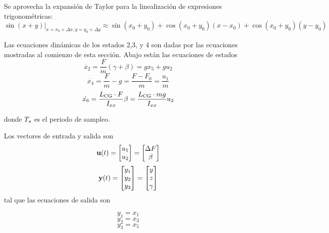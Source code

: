 Se aprovecha la expansión de Taylor para la linealización de expresiones trigonométricas:
\[
\sin(x+y)|_{x=x_0+\Delta x,y=y_0+\Delta y} \approx \sin(x_0+y_0) + \cos(x_0 + y_0) (x-x_0) + \cos(x_0 + y_0) (y-y_0)
\]

Las ecuaciones dinámicas de los estados 2,3, y 4 son dadas por las ecuaciones mostradas al comienzo de esta sección.
Abajo están las ecuaciones de estados
\begin{equation}
	\dot{x_2} = \frac{F}{m} \left( \gamma+\beta \right) = g x_5 + g u_2 
\end{equation}
\begin{equation}
\dot{x_4} = \frac{F}{m} - g =\frac{F-F_0}{m}= \frac{u_1}{m}
\end{equation}
\begin{equation}
\dot{x_6} = \frac{L_{\mathrm{CG}} \cdot F}{I_{xx}} \beta = \frac{L_{\mathrm{CG}} \cdot mg}{I_{xx}} u_2 
\end{equation}

donde $T_s$ es el periodo de sampleo.

Los vectores de entrada y salida son
\[
\mathbf{u}(t) = \begin{bmatrix}
u_1 \\
u_2
\end{bmatrix} = \begin{bmatrix}
\Delta F \\
\beta
\end{bmatrix}
\]
\[
\mathbf{y}(t) = \begin{bmatrix}
y_1 \\
y_2 \\
y_3
\end{bmatrix} = \begin{bmatrix}
y \\
z \\
\gamma
\end{bmatrix}
\]
tal que las ecuaciones de salida son

\begin{equation}
	y_1 = x_1 
\end{equation}
\begin{equation}
	y_2 = x_3
\end{equation}
\begin{equation}
	y_3 = x_5
\end{equation}

